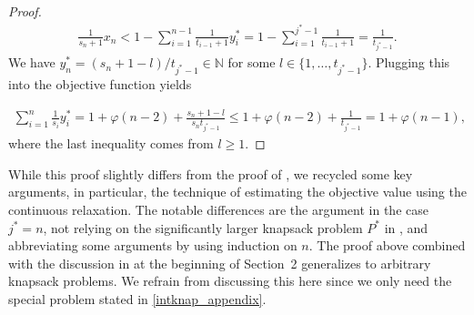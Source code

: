 \documentclass[pdflatex]{sn-jnl}
\newcommand{\N}{\mathbb{N}}
\theoremstyle{thmstyleone}%
\theoremstyle{thmstyletwo}%
\theoremstyle{thmstylethree}%
\begin{document}
\begin{proof}
		\begin{align*}
			\frac{1}{s_n + 1}x_n < 1 - \sum_{i=1}^{n-1} \frac{1}{t_{i-1} + 1}y^*_{i} =  1 - \sum_{i=1}^{j^*-1} \frac{1}{t_{i-1} + 1} = \frac{1}{t_{j^*-1}}.
		\end{align*} 
		We have $y^*_n = (s_n + 1 - l)/t_{j^*-1}\in\N$ for some $l\in\lbrace 1,\ldots,t_{j^*-1}\rbrace$. Plugging this into the objective function yields
		
		\begin{align*}
			\sum_{i=1}^n \frac{1}{s_i}y^*_i = 1 + \varphi(n-2) + \frac{s_n + 1 - l}{s_n t_{j^*-1}}\leq 1 + \varphi(n-2) + \frac{1}{t_{j^*-1}} = 1 + \varphi(n-1),
		\end{align*}
		where the last inequality comes from $l\geq 1$.
	\end{proof}
	
	While this proof slightly differs from the proof of \cite[Theorem~2]{kohlikrishna1992greedyknapsack}, we recycled some key arguments, in particular, the technique of estimating the objective value using the continuous relaxation. The notable differences are the argument in the case $j^* = n$, not relying on the significantly larger knapsack problem $P^*$ in \cite{kohlikrishna1992greedyknapsack}, and abbreviating some arguments by using induction on $n$. The proof above combined with the discussion in \cite{kohlikrishna1992greedyknapsack} at the beginning of Section~2 generalizes to arbitrary knapsack problems. We refrain from discussing this here since we only need the special problem stated in \eqref{intknap_appendix}.
	
\end{document}
